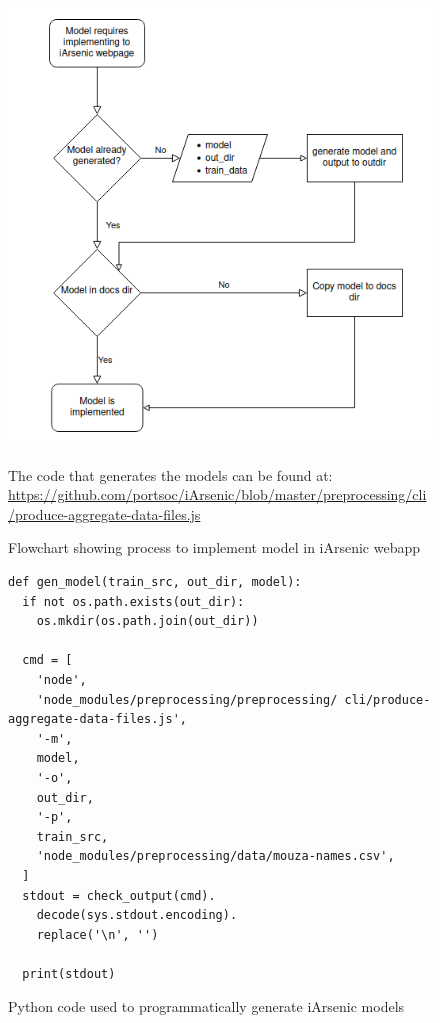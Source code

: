 \begin{figure}[h]
    \centering
    \includegraphics[scale=0.6]{figures/implement_ia_model_to_webapp.png} 
    \caption{Flowchart showing process to implement model in iArsenic webapp}
    \label{fig:x imp_iam_webapp}
    \small The code that generates the models can be found at: \url{https://github.com/portsoc/iArsenic/blob/master/preprocessing/cli/produce-aggregate-data-files.js}
\end{figure}

\begin{figure}[h]
    \begin{verbatim}
def gen_model(train_src, out_dir, model):
  if not os.path.exists(out_dir):
    os.mkdir(os.path.join(out_dir))

  cmd = [
    'node',
    'node_modules/preprocessing/preprocessing/ cli/produce-aggregate-data-files.js', 
    '-m',
    model,
    '-o',
    out_dir,
    '-p',
    train_src,
    'node_modules/preprocessing/data/mouza-names.csv',
  ]
  stdout = check_output(cmd).
    decode(sys.stdout.encoding).
    replace('\n', '')
    
  print(stdout)
      \end{verbatim}
    \caption{Python code used to programmatically generate iArsenic models}
    \label{fig:x programmatically_gen_ia_model}
\end{figure}

